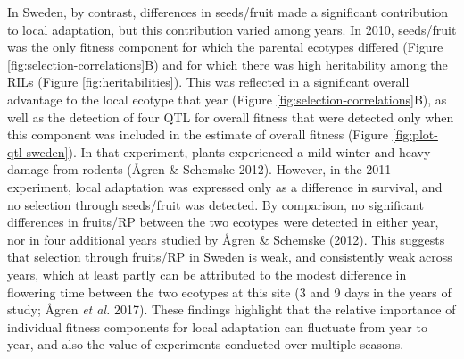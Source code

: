 \documentclass[]{article}
\begin{document}
In Sweden, by contrast, differences in seeds/fruit made a significant contribution to local adaptation, but this contribution varied among years. In 2010, seeds/fruit was the only fitness component for which the parental ecotypes differed (Figure \ref{fig:selection-correlations}B) and for which there was high heritability among the RILs (Figure \ref{fig:heritabilities}). This was reflected in a significant overall advantage to the local ecotype that year (Figure \ref{fig:selection-correlations}B), as well as the detection of four QTL for overall fitness that were detected only when this component was included in the estimate of overall fitness (Figure \ref{fig:plot-qtl-sweden}). In that experiment, plants experienced a mild winter and heavy damage from rodents (Ågren \& Schemske 2012). However, in the 2011 experiment, local adaptation was expressed only as a difference in survival, and no selection through seeds/fruit was detected. By comparison, no significant differences in fruits/RP between the two ecotypes were detected in either year, nor in four additional years studied by Ågren \& Schemske (2012). This suggests that selection through fruits/RP in Sweden is weak, and consistently weak across years, which at least partly can be attributed to the modest difference in flowering time between the two ecotypes at this site (3 and 9 days in the years of study; Ågren \emph{et al.} 2017). These findings highlight that the relative importance of individual fitness components for local adaptation can fluctuate from year to year, and also the value of experiments conducted over multiple seasons.
\end{document}
